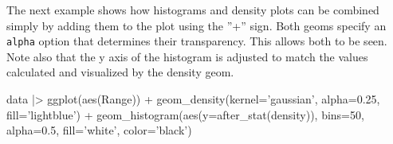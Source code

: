 



The next example shows how histograms and density plots can be combined simply by adding them to the plot using the ''+'' sign. Both geoms specify an \texttt{alpha} option that determines their transparency. This allows both to be seen. Note also that the y axis of the histogram is adjusted to match the values calculated and visualized by the density geom. 

\begin{samepage}
\begin{Rcode}
data |> ggplot(aes(Range)) +
    geom_density(kernel='gaussian', 
        alpha=0.25, fill='lightblue') +
    geom_histogram(aes(y=after_stat(density)), bins=50, 
        alpha=0.5, fill='white', color='black')
\end{Rcode}
\end{samepage}

